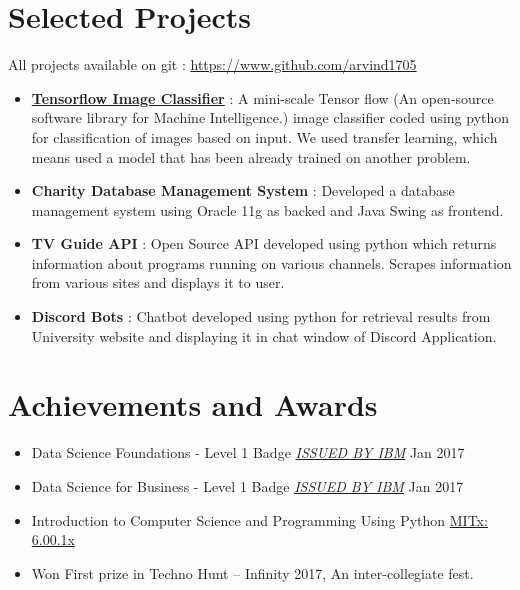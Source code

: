 \documentclass[margin, centered]{res}
\begin{document}
\begin{resume}
\section{Selected Projects}
All projects available on git : \url{https://www.github.com/arvind1705}
\begin{itemize}[leftmargin=*]
 \item \textbf{\href{https://github.com/arvind1705/Tensorflow-Image-Classifier}{Tensorflow Image Classifier}} : A mini-scale Tensor flow (An open-source software library for
Machine Intelligence.) image classifier coded using python for classification of images based on input. We used transfer learning, which means used a model that has been already trained on another problem.
 \item \textbf{{Charity Database Management System}} : Developed a database management system using Oracle 11g as backed and Java Swing as frontend.
 \item \textbf{{TV Guide API}} : Open Source API developed using python which returns information about programs running on various channels. Scrapes information from various sites and displays it to user.
  \item \textbf{{Discord Bots}} : Chatbot developed using python for retrieval results from University website and displaying it in chat window of Discord Application.
\end{itemize}


\section{Achievements and Awards}
\begin{itemize}[leftmargin=*]
 
 \item Data Science Foundations - Level 1 Badge
 \href{https://www.youracclaim.com/badges/9a193839-4e4d-49a0-9acf-068b7769421a/linked_in_profile}{\emph{ISSUED BY
IBM}} Jan 2017
\item Data Science for Business - Level 1 Badge
 \href{https://www.youracclaim.com/badges/576e9ba6-60b5-4cea-b3a4-5e80e6a6a980}{\emph{ISSUED BY
IBM}} Jan 2017
 \item Introduction to Computer Science and Programming Using Python \href{https://drive.google.com/file/d/0By03r7DCQ78FNjBUbE5mUDdpSXM/view?usp=sharing}{MITx: 6.00.1x}
 \item Won First prize in Techno Hunt – Infinity 2017, An inter-collegiate fest.


\end{itemize}
\end{resume}
\end{document}
